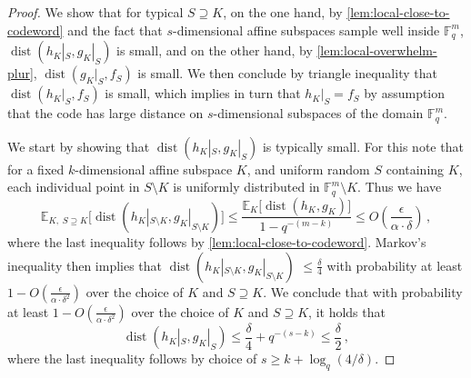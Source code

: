 \documentclass[11pt]{article}
\numberwithin{equation}{section}
\theoremstyle{definition}
\theoremstyle{plain}
\theoremstyle{plain}
\DeclareMathOperator{\dist}{dist} %
\newcommand{\E}{{\mathbb{E}}}
\newcommand{\F}{{\mathbb{F}}}
\begin{document}
\begin{proof}
  We show that for typical $S \supseteq K$, on the one hand, by \cref{lem:local-close-to-codeword} and the fact that $s$-dimensional affine subspaces sample well inside $\F_q^m$, $\dist(h_K|_S, g_K|_S)$ is small, and on the other hand, by \cref{lem:local-overwhelm-plur}, $\dist(g_K|_S, f_S)$ is small. We then conclude by triangle inequality that $\dist(h_K|_S, f_S)$ is  small, which implies in turn that $h_K|_S = f_S$ by assumption that the code
has large distance  %
on $s$-dimensional subspaces
of the domain $\F_q^m$.   %
%

We start by showing that $\dist(h_K|_S, g_K|_S)$ is typically small.
For this note that for a fixed $k$-dimensional affine subspace $K$, and uniform random $S$ containing $K$, each individual point in $S \setminus K$ is uniformly distributed in $\F_q^m\setminus K$. Thus we have
\[
 \E_{K,\;S \supseteq K}\big[\dist(h_{K}|_{S\setminus K},g_{K}|_{S \setminus K})\big] \leq \frac{\mathbb{E}_{K}\big[\dist(h_K,g_K)\big] } {1- q^{-(m-k)}}\leq O\left(\frac{\epsilon} {\alpha \cdot \delta}\right)\,,
\]
 where the last inequality follows by \cref{lem:local-close-to-codeword}. Markov's inequality then implies that 
 $\dist(h_{K}|_{S\setminus K},g_{K}|_{S \setminus K})$
%
$ \leq \frac{\delta} {4}$ with probability at least $1- O\left(\frac{\epsilon} {\alpha \cdot \delta^2}\right)$ over the choice of  $K$ and $S \supseteq K$. We conclude that with probability at least $1- O\left(\frac{\epsilon} {\alpha \cdot \delta^2}\right)$ over the choice of  $K$ and $S \supseteq K$, it holds that
  \begin{equation}\label{eq:g-h-close-on-T}
 \dist(h_K|_S, g_K|_S) \leq \frac{\delta} {4} + q^{-(s-k)}\leq \frac{\delta} {2}\, ,
  \end{equation}
 where the last inequality follows by choice of $s \geq k + \log_q(4/\delta)$.


\end{proof}
\end{document}
